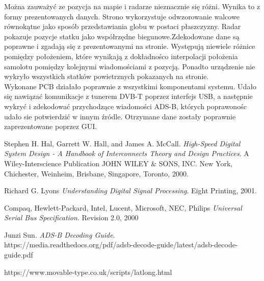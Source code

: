 \documentclass[eng,printmode]{mgr}
\begin{document}
Można zauważyć ze pozycja na mapie i radarze nieznacznie się różni. Wynika to z formy prezentowanych danych. Strono wykorzystuje odwzorowanie walcowe równokątne jako sposób przedstawiania globu w postaci płaszczyzny. Radar pokazuje pozycje statku jako współrzędne biegunowe.Zdekodowane dane są poprawne i zgadają się z prezentowanymi na stronie. Występują niewiele różnice pomiędzy położeniem, które wynikają z dokładnośco interpolacji położenia samolotu pomiędzy kolejnymi wiadomościami z pozycją. Ponadto urządzenie nie wykryło wszystkich statków powietrznych pokazanych na stronie.
\\


Wykonane PCB działało poprawnie z wszystkimi komponentami systemu. Udało się nawiązać komunikacje z tunerem DVB-T poprzez interfejs USB, a następnie wykryć i zdekodować przychodzące wiadomości ADS-B, których poprawonośc udało sie potwierdzić w innym źródle. Otrzymane dane zostały poprawnie zaprezentowane poprzez GUI.


\begin{thebibliography}{9}
Stephen H. Hal, Garrett W. Hall, and James A. McCall. 
\textit{High-Speed Digital System Design - A Handbook of Interconnects Theory and Design Practices}.
A Wiley-Interscience Publication JOHN WILEY \& SONS, INC.
New York, Chichester, Weinheim, Brisbane, Singapore, Toronto, 2000.

Richard G. Lyons
\textit{Understanding Digital Signal Processing}.
Eight Printing, 2001.

Compaq,
Hewlett-Packard,
Intel,
Lucent,
Microsoft,
NEC,
Philips
\textit{Universal Serial Bus Specification}.
Revision 2.0,
2000

Junzi Sun. 
\textit{ADS-B Decoding Guide}.\\
https://media.readthedocs.org/pdf/adsb-decode-guide/latest/adsb-decode-guide.pdf

https://www.movable-type.co.uk/scripts/latlong.html

\end{thebibliography}
\end{document}
